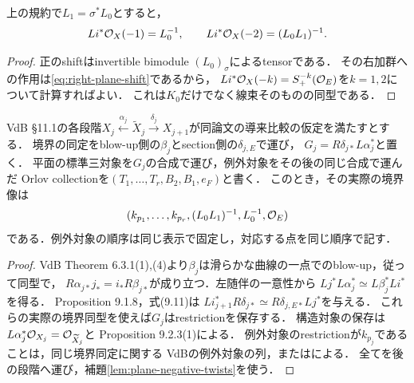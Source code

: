 \begin{lemma}[負の平面twistの実際の境界像]\label{lem:plane-negative-twists}
上の規約で$L_1=\sigma^*L_0$とすると，
\[
 Li^*\mathcal O_X(-1)=L_0^{-1},\qquad
 Li^*\mathcal O_X(-2)=(L_0L_1)^{-1}.
\]
\end{lemma}
\begin{proof}
正のshiftはinvertible bimodule $(L_0)_\sigma$によるtensorである．
その右加群への作用は\eqref{eq:right-plane-shift}であるから，
$Li^*\mathcal O_X(-k)=S_+^{-k}(\mathcal O_E)$を$k=1,2$について計算すればよい．
これは$K_0$だけでなく線束そのものの同型である．
\end{proof}

\begin{proposition}[反復比較を通るrestrictionの保存]\label{prop:transported-tuple}
VdB \S11.1の各段階$X_j\xleftarrow{\alpha_j}\widetilde X_j
\xrightarrow{\delta_j}X_{j+1}$が同論文の導来比較の仮定を満たすとする．
境界の同定をblow-up側の$\beta_j$とsection側の$\delta_{j,E}$で運び，
$G_j=R\delta_{j*}L\alpha_j^*$と置く．
平面の標準三対象を$G_{j}$の合成で運び，例外対象をその後の同じ合成で運んだ
Orlov collectionを$(T_1,\ldots,T_r,B_2,B_1,e_F)$と書く．
このとき，その実際の境界像は
\begin{equation}\label{eq:right-actual-tuple}
 (k_{p_1},\ldots,k_{p_r},(L_0L_1)^{-1},L_0^{-1},\mathcal O_E)
\end{equation}
である．例外対象の順序は同じ表示で固定し，対応する点を同じ順序で記す．
\end{proposition}
\begin{proof}
VdB Theorem 6.3.1(1),(4)より$\beta_j$は滑らかな曲線の一点でのblow-up，従って同型で，
$R\alpha_{j*}j_*=i_*R\beta_{j*}$が成り立つ．左随伴の一意性から
$Lj^*L\alpha_j^*\simeq L\beta_j^*Li^*$を得る．
Proposition 9.1.8，式(9.11)は
$Li_{j+1}^*R\delta_{j*}\simeq R\delta_{j,E*}Lj^*$を与える．
これらの実際の境界同型を使えば$G_j$はrestrictionを保存する．
構造対象の保存は$L\alpha_j^*\mathcal O_{X_j}=\mathcal O_{\widetilde X_j}$と
Proposition 9.2.3(1)による．
例外対象のrestrictionが$k_{p_j}$であることは，同じ境界同定に関する
VdBの例外対象の列，または\cite[(9.24)--(9.27)]{AOU}による．
全てを後の段階へ運び，補題\ref{lem:plane-negative-twists}を使う．
\end{proof}

